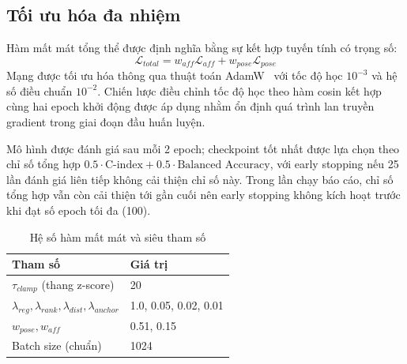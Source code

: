 \subsection{Tối ưu hóa đa nhiệm}
Hàm mất mát tổng thể được định nghĩa bằng sự kết hợp tuyến tính có trọng số:
\begin{equation}
    \mathcal{L}_{total} = w_{aff}\mathcal{L}_{aff} + w_{pose}\mathcal{L}_{pose}
    \label{eq:ltotal}
\end{equation}
Mạng được tối ưu hóa thông qua thuật toán AdamW~\cite{loshchilov2017decoupled} với tốc độ học $10^{-3}$ và hệ số điều chuẩn $10^{-2}$. Chiến lược điều chỉnh tốc độ học theo hàm cosin kết hợp cùng hai epoch khởi động được áp dụng nhằm ổn định quá trình lan truyền gradient trong giai đoạn đầu huấn luyện.

Mô hình được đánh giá sau mỗi 2 epoch; checkpoint tốt nhất được lựa chọn theo chỉ số tổng hợp $0.5 \cdot \text{C-index} + 0.5 \cdot \text{Balanced Accuracy}$, với early stopping nếu 25 lần đánh giá liên tiếp không cải thiện chỉ số này. Trong lần chạy báo cáo, chỉ số tổng hợp vẫn còn cải thiện tới gần cuối nên early stopping không kích hoạt trước khi đạt số epoch tối đa (100).


\begin{table}[H]
\centering
\caption{Hệ số hàm mất mát và siêu tham số}
\label{tab:hyperparams}
\footnotesize
\begin{tabular}{ll}
\hline
\textbf{Tham số} & \textbf{Giá trị} \\
\hline
$\tau_{clamp}$ (thang z-score) & 20 \\
$\lambda_{reg}, \lambda_{rank}, \lambda_{dist}, \lambda_{anchor}$ & 1.0, 0.05, 0.02, 0.01 \\
$w_{pose}, w_{aff}$ & 0.51, 0.15 \\
Batch size (chuẩn) & 1024 \\
\hline
\end{tabular}
\end{table}